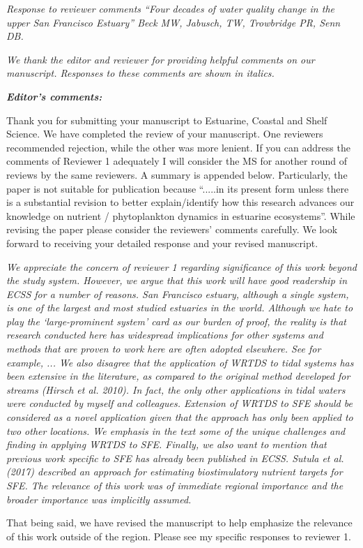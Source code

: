 \documentclass[letterpaper,12pt]{article}
\newcommand{\Bigtxt}[1]{\textbf{\textit{#1}}}
\begin{document}
\raggedright


{\it Response to reviewer comments ``Four decades of water quality change in the upper San Francisco Estuary'' Beck MW, Jabusch, TW, Trowbridge PR, Senn DB.}

{\it We thank the editor and reviewer for providing helpful comments on our manuscript.  Responses to these comments are shown in italics.}

\Bigtxt{Editor's comments:}

Thank you for submitting your manuscript to Estuarine, Coastal and Shelf Science. We have completed the review of your manuscript. One reviewers recommended rejection, while the other was more lenient. If you can address the comments of Reviewer 1 adequately I will consider the MS for another round of reviews by the same reviewers. A summary is appended below. Particularly, the paper is not suitable for publication because ``.....in its present form unless there is a substantial revision to better explain/identify how this research advances our knowledge on nutrient / phytoplankton dynamics in estuarine ecosystems''.  While revising the paper please consider the reviewers' comments carefully. We look forward to receiving your detailed response and your revised manuscript.

{\it We appreciate the concern of reviewer 1 regarding significance of this work beyond the study system.  However, we argue that this work will have good readership in ECSS for a number of reasons.  San Francisco estuary, although a single system, is one of the largest and most studied estuaries in the world.  Although we hate to play the `large-prominent system' card as our burden of proof, the reality is that research conducted here has widespread implications for other systems and methods that are proven to work here are often adopted elsewhere.  See for example, ...  We also disagree that the application of WRTDS to tidal systems has been extensive in the literature, as compared to the original method developed for streams (Hirsch et al. 2010).  In fact, the only other applications in tidal waters were conducted by myself and colleagues.  Extension of WRTDS to SFE should be considered as a novel application given that the approach has only been applied to two other locations.  We emphasis in the text some of the unique challenges and finding in applying WRTDS to SFE.  Finally, we also want to mention that previous work specific to SFE has already been published in ECSS.  Sutula et al. (2017) described an approach for estimating biostimulatory nutrient targets for SFE.  The relevance of this work was of immediate regional importance and the broader importance was implicitly assumed. 

That being said, we have revised the manuscript to help emphasize the relevance of this work outside of the region.  Please see my specific responses to reviewer 1. 
}
\end{document}

